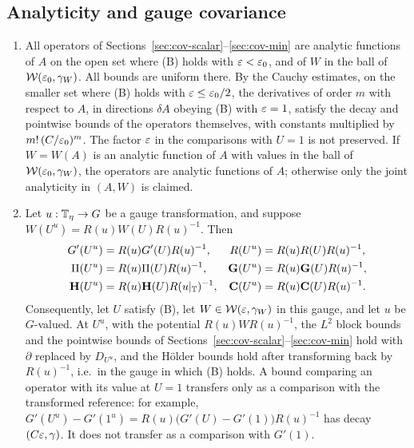\subsection{Analyticity and gauge covariance}\label{ss:16.1}

\begin{proposition}\label{prop:covariance}
\begin{enumerate}[label=(\alph*)]
\item All operators of Sections~\ref{sec:cov-scalar}--\ref{sec:cov-min} are analytic functions of $A$ on the open set where (B) holds with $\varepsilon<\varepsilon_0$, and of $W$ in the ball of $\mathcal W(\varepsilon_0,\gamma_W)$. All bounds are uniform there. By the Cauchy estimates, on the smaller set where (B) holds with $\varepsilon\le\varepsilon_0/2$, the derivatives of order $m$ with respect to $A$, in directions $\delta A$ obeying (B) with $\varepsilon=1$, satisfy the decay and pointwise bounds of the operators themselves, with constants multiplied by $m!\,(C/\varepsilon_0)^m$. The factor $\varepsilon$ in the comparisons with $U=1$ is not preserved. If $W=W(A)$ is an analytic function of $A$ with values in the ball of $\mathcal W(\varepsilon_0,\gamma_W)$, the operators are analytic functions of $A$; otherwise only the joint analyticity in $(A,W)$ is claimed.
\item Let $u:\mathbb T_\eta\to G$ be a gauge transformation, and suppose $W(U^u)=R(u)W(U)R(u)^{-1}$. Then
\begin{align*}
G'(U^u)&=R(u)G'(U)R(u)^{-1}, & R(U^u)&=R(u)R(U)R(u)^{-1},\\
\Pi(U^u)&=R(u)\Pi(U)R(u)^{-1}, & \mathbf G(U^u)&=R(u)\mathbf G(U)R(u)^{-1},\\
\mathbf H(U^u)&=R(u)\mathbf H(U)R(u|_\mathbb T)^{-1}, & \mathbf C(U^u)&=R(u)\mathbf C(U)R(u)^{-1}.
\end{align*}
Consequently, let $U$ satisfy (B), let $W\in\mathcal W(\varepsilon,\gamma_W)$ in this gauge, and let $u$ be $G$-valued. At $U^u$, with the potential $R(u)WR(u)^{-1}$, the $L^2$ block bounds and the pointwise bounds of Sections~\ref{sec:cov-scalar}--\ref{sec:cov-min} hold with $\partial$ replaced by $D_{U^u}$, and the H\"older bounds hold after transforming back by $R(u)^{-1}$, i.e.\ in the gauge in which (B) holds. A bound comparing an operator with its value at $U=1$ transfers only as a comparison with the transformed reference: for example, $G'(U^u)-G'(1^u)=R(u)\big(G'(U)-G'(1)\big)R(u)^{-1}$ has decay $(C\varepsilon,\gamma)$. It does not transfer as a comparison with $G'(1)$.
\end{enumerate}
\end{proposition}

